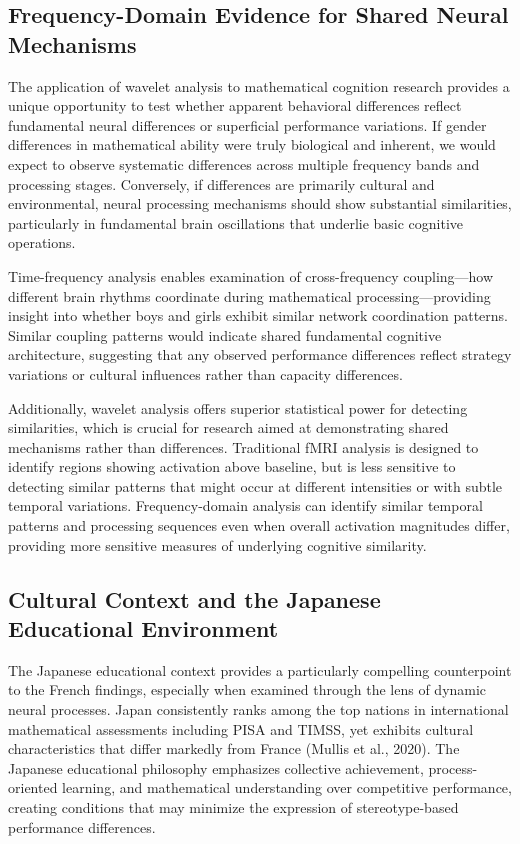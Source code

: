 \documentclass[pdflatex,reference]{sn-jnl}%
\theoremstyle{thmstyleone}%
\theoremstyle{thmstyletwo}%
\theoremstyle{thmstylethree}%
\begin{document}
\subsection{Frequency-Domain Evidence for Shared Neural Mechanisms}
The application of wavelet analysis to mathematical cognition research provides a unique opportunity to test whether apparent behavioral differences reflect fundamental neural differences or superficial performance variations. If gender differences in mathematical ability were truly biological and inherent, we would expect to observe systematic differences across multiple frequency bands and processing stages. Conversely, if differences are primarily cultural and environmental, neural processing mechanisms should show substantial similarities, particularly in fundamental brain oscillations that underlie basic cognitive operations.

Time-frequency analysis enables examination of cross-frequency coupling—how different brain rhythms coordinate during mathematical processing—providing insight into whether boys and girls exhibit similar network coordination patterns. Similar coupling patterns would indicate shared fundamental cognitive architecture, suggesting that any observed performance differences reflect strategy variations or cultural influences rather than capacity differences.

Additionally, wavelet analysis offers superior statistical power for detecting similarities, which is crucial for research aimed at demonstrating shared mechanisms rather than differences. Traditional fMRI analysis is designed to identify regions showing activation above baseline, but is less sensitive to detecting similar patterns that might occur at different intensities or with subtle temporal variations. Frequency-domain analysis can identify similar temporal patterns and processing sequences even when overall activation magnitudes differ, providing more sensitive measures of underlying cognitive similarity.


\subsection{Cultural Context and the Japanese Educational Environment}
The Japanese educational context provides a particularly compelling counterpoint to the French findings, especially when examined through the lens of dynamic neural processes. Japan consistently ranks among the top nations in international mathematical assessments including PISA and TIMSS, yet exhibits cultural characteristics that differ markedly from France (Mullis et al., 2020). The Japanese educational philosophy emphasizes collective achievement, process-oriented learning, and mathematical understanding over competitive performance, creating conditions that may minimize the expression of stereotype-based performance differences.
\end{document}
